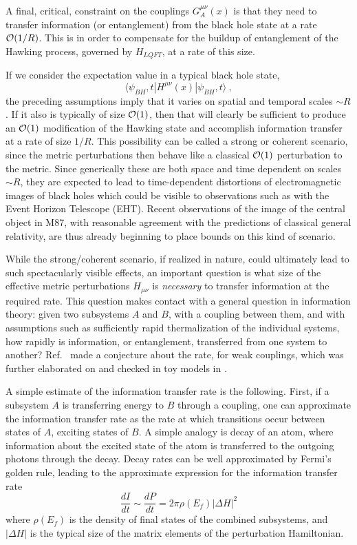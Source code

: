 \documentclass[12pt]{article}
\numberwithin{equation}{section}
\newcommand{\calo}{{\cal O}}
\newcommand{\beq}{\begin{equation}}
\newcommand{\eeq}{\end{equation}}
\begin{document}
A final, critical, constraint on the couplings $G_A^{\mu\nu}(x)$ is that they need to transfer information (or entanglement) from the black hole state at a rate $\calo(1/R)$.  This is in order to compensate for the buildup of entanglement of the Hawking process, governed by $H_{LQFT}$, at a rate of this size. 

If we consider the expectation value in a typical black hole state,
\beq
\langle \psi_{BH},t|H^{\mu\nu}(x)|\psi_{BH},t\rangle\ ,
\eeq
the preceding assumptions imply that it varies on spatial and temporal scales $\sim R$.  If it also is typically of size $\calo(1)$, then that will clearly be sufficient to produce an $\calo(1)$ modification of the Hawking state and accomplish information transfer at a rate of size $1/R$.  This possibility can be called a strong or coherent scenario, since the metric perturbations then behave like a classical $\calo(1)$ perturbation to the metric.  Since generically these are both space and time dependent on scales $\sim R$, they are expected to lead to time-dependent distortions of electromagnetic images of black holes\cite{SGObs,SGAstro,GiPs} which could be visible to observations such as with the Event Horizon Telescope (EHT).  Recent observations of the image of the central object in M87\cite{EHT}, with reasonable agreement with the predictions of classical general relativity, are thus already beginning to place bounds on this kind of scenario.

While the strong/coherent scenario, if realized in nature, could ultimately lead to such spectacularly visible effects, an important question is what size of the effective metric perturbations $H_{\mu\nu}$ is {\it necessary} to transfer information at the required rate.  This question makes contact with a general question in information theory: given two subsystems $A$ and $B$, with a coupling between them, and with assumptions such as sufficiently rapid thermalization of the individual systems, how rapidly is information, or entanglement, transferred from one system to another?  Ref.~\cite{NVU} made a conjecture about the rate, for weak couplings, which was further elaborated on and checked in toy models in \cite{GiRo}.  

A simple estimate of the information transfer rate is the following.  First, if a subsystem $A$ is transferring energy to $B$ through a coupling, one can approximate the information transfer rate as the rate at which transitions occur between states of $A$, exciting states of $B$.  A simple analogy is decay of an atom, where information about the excited state of the atom is transferred to the outgoing photons through the decay.  Decay rates can be well approximated by Fermi's golden rule, leading to the approximate expression for the information transfer rate
\beq\label{inforate}
\frac{dI}{dt}\sim \frac{dP}{dt}=2\pi\rho(E_f) |\Delta H|^2
\eeq
where $\rho(E_f)$ is the density of final states of the combined subsystems, and $|\Delta H|$ is the typical size of the matrix elements of the perturbation Hamiltonian.
\end{document}
